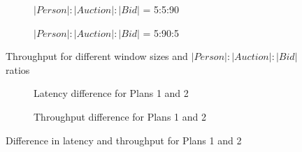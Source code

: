 \begin{figure}[!ht]
    \centering
    \begin{subfigure}[b]{0.45\textwidth}
            
            \captionsetup{justification=justified}
            \caption{$|Person|:|Auction|:|Bid|$ = 5:5:90}
            \label{fig:throughput_window_5590}
    \end{subfigure}
    \hspace{1.25mm}
    \begin{subfigure}[b]{0.45\textwidth}
            
            \captionsetup{justification=justified}
            \caption{$|Person|:|Auction|:|Bid|$ = 5:90:5}
            \label{fig:throughput_window_5905}
    \end{subfigure}
    \caption{Throughput for different window sizes and $|Person|:|Auction|:|Bid|$ ratios}
    \label{fig:throughput_plots}
\end{figure}

\begin{figure}[!ht]
    \centering
    \begin{subfigure}[b]{0.45\textwidth}
            
            \captionsetup{justification=justified}
            \caption{Latency difference for Plans 1 and 2}
            \label{fig:latency_diff_against_window_size}
    \end{subfigure}
    \hspace{1.25mm}
    \begin{subfigure}[b]{0.45\textwidth}
        
        \captionsetup{justification=justified}
        \caption{Throughput difference for Plans 1 and 2}
        \label{fig:throughput_diff_against_window_size}
    \end{subfigure}
    \caption{Difference in latency and throughput for Plans 1 and 2}
    \label{fig:latency_and_throughput_difference}
\end{figure}

